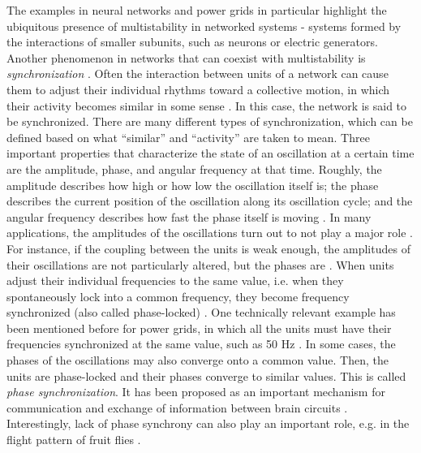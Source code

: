 The examples in neural networks and power grids in particular highlight the ubiquitous presence of multistability in networked systems - systems formed by the interactions of smaller subunits, such as neurons or electric generators.  Another phenomenon in networks that can coexist with multistability is \textit{synchronization} \cite{pikovsky2001synchronization, boccaletti2018synchronization}. Often the interaction between units of a network can cause them to adjust their individual rhythms toward a collective motion, in which their activity becomes similar in some sense \cite{pikovsky2001synchronization}. In this case, the network is said to be synchronized. There are many different types of synchronization, which can be defined based on what ``similar'' and ``activity'' are taken to mean. Three important properties that characterize the state of an oscillation at a certain time are the amplitude, phase, and angular frequency at that time. Roughly, the amplitude describes how high or how low the oscillation itself is; the phase describes the current position of the oscillation along its oscillation cycle; and the angular frequency describes how fast the phase itself is moving \cite{pikovsky2001synchronization}.
In many applications, the amplitudes of the oscillations turn out to not play a major role \cite{pikovsky2001synchronization, arenas2008synchronization}. For instance, if the coupling between the units is weak enough, the amplitudes of their oscillations are not particularly altered, but the phases are \cite{pikovsky2001synchronization, strogatz2000from}. When units adjust their individual frequencies to the same value, i.e. when they spontaneously lock into a common frequency, they become frequency synchronized (also called phase-locked) \cite{pikovsky2001synchronization, strogatz2000from}. One technically relevant example has been mentioned before for power grids, in which all the units must have their frequencies synchronized at the same value, such as 50 Hz \cite{hellmann2020network}. In some cases, the phases of the oscillations may also converge onto a common value. Then, the units are phase-locked and their phases converge to similar values. This is called \textit{phase synchronization}. It has been proposed as an important mechanism for communication and exchange of information between brain circuits \cite{singer1999neuronal, fries2015rhythms, womelsdorf2007the}. Interestingly, lack of phase synchrony can also play an important role, e.g. in the flight pattern of fruit flies \cite{hurkey2023gap}. 

